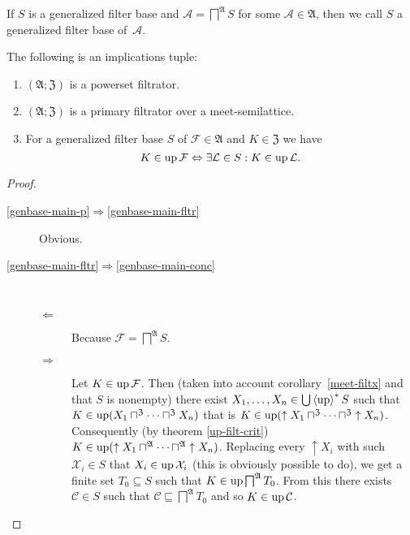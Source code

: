 \begin{defn}
If $S$ is a generalized filter base and $\mathcal{A}=\bigsqcap^{\mathfrak{A}}S$
for some $\mathcal{A}\in\mathfrak{A}$, then we call $S$ a generalized
filter base of~$\mathcal{A}$.\end{defn}
\begin{thm}
\label{genbase-main}The following is an implications tuple:
\begin{enumerate}
\item \label{genbase-main-p}$(\mathfrak{A};\mathfrak{Z})$ is a powerset
filtrator.
\item \label{genbase-main-fltr}$(\mathfrak{A};\mathfrak{Z})$ is a primary
filtrator over a meet-semilattice.
\item \label{genbase-main-conc}For a generalized filter base $S$ of $\mathcal{F}\in\mathfrak{A}$
and $K\in\mathfrak{Z}$ we have 
\[
K\in\operatorname{up}\mathcal{F}\Leftrightarrow\exists\mathcal{L}\in S:K\in\operatorname{up}\mathcal{L}.
\]

\end{enumerate}
\end{thm}
\begin{proof}
~
\begin{description}
\item [{\ref{genbase-main-p}$\Rightarrow$\ref{genbase-main-fltr}}] Obvious.
\item [{\ref{genbase-main-fltr}$\Rightarrow$\ref{genbase-main-conc}}] ~

\begin{description}
\item [{$\Leftarrow$}] Because $\mathcal{F}=\bigsqcap^{\mathfrak{A}}S$.
\item [{$\Rightarrow$}] Let $K\in\operatorname{up}\mathcal{F}$. Then (taken into account
corollary~\ref{meet-filtx} and that $S$ is nonempty) there exist
$X_{1},\dots,X_{n}\in\bigcup\left\langle \operatorname{up}\right\rangle ^{\ast}S$ such that $K\in\operatorname{up}(X_{1}\sqcap^{\mathfrak{Z}}\dots\sqcap^{\mathfrak{Z}}X_{n})$
that is $K\in\operatorname{up}(\uparrow X_{1}\sqcap^{\mathfrak{Z}}\dots\sqcap^{\mathfrak{Z}}\uparrow X_{n})$.
Consequently (by theorem \ref{up-filt-crit}) $K\in\operatorname{up}(\uparrow X_{1}\sqcap^{\mathfrak{A}}\dots\sqcap^{\mathfrak{A}}\uparrow X_{n})$.
Replacing every $\uparrow X_{i}$ with such $\mathcal{X}_{i}\in S$
that $X_{i}\in\operatorname{up}\mathcal{X}_{i}$ (this is obviously possible to
do), we get a finite set $T_{0}\subseteq S$ such that $K\in\operatorname{up}\bigsqcap^{\mathfrak{A}}T_{0}$.
From this there exists $\mathcal{C}\in S$ such that $\mathcal{C}\sqsubseteq\bigsqcap^{\mathfrak{A}}T_{0}$
and so $K\in\operatorname{up}\mathcal{C}$.
\end{description}
\end{description}
\end{proof}
